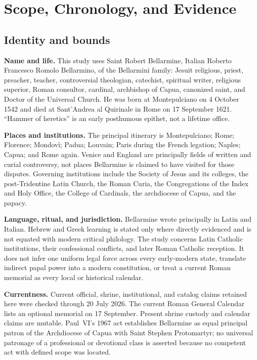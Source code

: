 \section{Scope, Chronology, and Evidence}
\label{sec:bellarmine-apparatus}

\subsection{Identity and bounds}

\textbf{Name and life.} This study uses Saint Robert Bellarmine, Italian
Roberto Francesco Romolo Bellarmino, of the Bellarmini family: Jesuit religious, priest, preacher,
teacher, controversial theologian, catechist, spiritual writer, religious
superior, Roman consultor, cardinal, archbishop of Capua, canonized saint, and
Doctor of the Universal Church.  He was born at Montepulciano on 4 October
1542 and died at Sant'Andrea al Quirinale in Rome on 17 September 1621.
``Hammer of heretics'' is an early posthumous epithet, not a lifetime office.

\textbf{Places and institutions.} The principal itinerary is Montepulciano;
Rome; Florence; Mondovì; Padua; Louvain; Paris during the French legation;
Naples; Capua; and Rome again.  Venice and England are principally fields of
written and curial controversy, not places Bellarmine is claimed to have
visited for those disputes.  Governing institutions include the Society of
Jesus and its colleges, the post-Tridentine Latin Church, the Roman Curia, the
Congregations of the Index and Holy Office, the College of Cardinals, the
archdiocese of Capua, and the papacy.

\textbf{Language, ritual, and jurisdiction.} Bellarmine wrote principally in
Latin and Italian.  Hebrew and Greek learning is stated only where directly
evidenced and is not equated with modern critical philology.  The study concerns
Latin Catholic institutions, their confessional conflicts, and later Roman
Catholic reception.  It does not infer one uniform legal force across every
early-modern state, translate indirect papal power into a modern constitution,
or treat a current Roman memorial as every local or historical calendar.

\textbf{Currentness.} Current official, shrine, institutional, and catalog
claims retained here were checked through 20 July 2026.  The current Roman
General Calendar lists an optional memorial on 17 September.  Present shrine
custody and calendar claims are mutable.  Paul~VI's 1967 act establishes
Bellarmine as equal principal patron of the Archdiocese of Capua with Saint
Stephen Protomartyr; no universal patronage of a professional or devotional
class is asserted because no competent act with defined scope was located.

